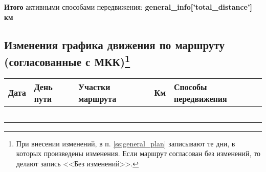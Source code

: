 \documentclass[a5paper, 12pt, twoside]{article}
\begin{document}
        {\small%
        \textbf{Итого} активными способами передвижения: \textbf{ {{general_info['total_distance']}}\,км}}

\newpage %
    \thispagestyle{empty}
    \subsection[]{Изменения графика движения по маршруту (согласованные с МКК)\protect\footnote{\tiny При внесении изменений, в п. \ref{ss:general_plan} записывают те дни, в которых произведены изменения. Если маршрут согласован без изменений, то делают запись <<Без изменений>>.}}
        \vspace{-0.6cm}

        {\scriptsize%
        \begin{longtable}{%
            |>{\centering\arraybackslash} m{1cm}%
            |>{\centering\arraybackslash} m{0.8cm}%
            |>{\centering\arraybackslash} m{7cm}%
            |>{\centering\arraybackslash} m{1.3cm}%
            |>{\centering\arraybackslash} m{2.1cm}|}
            \hline\rowcolor{Gray}
            Дата            &   День пути   &   Участки маршрута                                                                                                                                &   Км      &   Способы передвижения\\ \hline
                            &               &                                                                                                                                                   &           &                       \\ \hline
                            &               &                                                                                                                                                   &           &                       \\ \hline
                            &               &                                                                                                                                                   &           &                       \\ \hline
                            &               &                                                                                                                                                   &           &                       \\ \hline
                            &               &                                                                                                                                                   &           &                       \\ \hline
        \end{longtable}}
        \vspace{-1cm}
     
\end{document}

